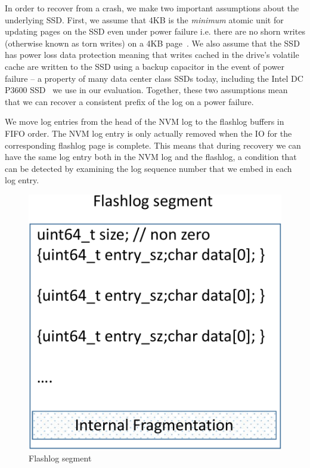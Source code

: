 \documentclass[pageno]{jpaper}
\begin{document}
In order to recover from a crash, we make two important assumptions about the
underlying SSD. First, we assume that 4KB is the \emph{minimum} atomic unit for
updating pages on the SSD even under power failure i.e. there are no shorn
writes (otherwise known as torn writes) on a 4KB page~\cite{shorn_writes}. We
also assume that the SSD has power loss data protection meaning that writes
cached in the drive's volatile cache are written to the SSD using a backup
capacitor in the event of power failure -- a property of many data center class
SSDs today, including the Intel DC P3600 SSD~\cite{ssd_spec} we use in our
evaluation. Together, these two assumptions mean that we can recover a
consistent prefix of the log on a power failure.

We move log entries from the head of the NVM log to the flashlog buffers in FIFO
order. The NVM log entry is only actually removed when the IO for the
corresponding flashlog page is complete. This means that during recovery we can
have the same log entry both in the NVM log and the flashlog, a condition that
can be detected by examining the log sequence number that we embed in each log
entry.

\begin{figure}
  \centering
  \includegraphics[scale=0.4]{figures2/flashlog_page.pdf}
  \caption{Flashlog segment}
  \label{fig:flashlog_page}
\end{figure}
\end{document}
